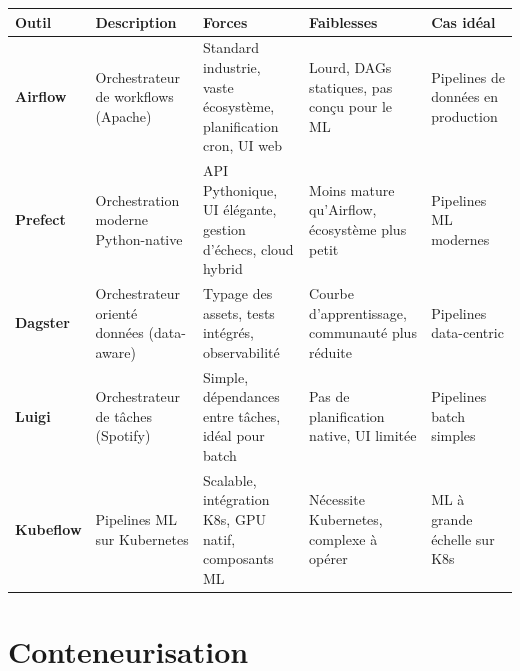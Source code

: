 \begin{center}
\small
\begin{tabular}{@{}p{1.8cm}p{3cm}p{3cm}p{3cm}p{2cm}@{}}
\toprule
\textbf{Outil} & \textbf{Description} & \textbf{Forces} &
  \textbf{Faiblesses} & \textbf{Cas id\'eal} \\
\midrule
\textbf{Airflow} & Orchestrateur de workflows (Apache) &
  Standard industrie, vaste \'ecosyst\`eme, planification cron, UI web &
  Lourd, DAGs statiques, pas con\c{c}u pour le ML &
  Pipelines de donn\'ees en production \\
\addlinespace
\textbf{Prefect} & Orchestration moderne Python-native &
  API Pythonique, UI \'el\'egante, gestion d'\'echecs, cloud hybrid &
  Moins mature qu'Airflow, \'ecosyst\`eme plus petit &
  Pipelines ML modernes \\
\addlinespace
\textbf{Dagster} & Orchestrateur orient\'e donn\'ees (data-aware) &
  Typage des assets, tests int\'egr\'es, observabilit\'e &
  Courbe d'apprentissage, communaut\'e plus r\'eduite &
  Pipelines data-centric \\
\addlinespace
\textbf{Luigi} & Orchestrateur de t\^aches (Spotify) &
  Simple, d\'ependances entre t\^aches, id\'eal pour batch &
  Pas de planification native, UI limit\'ee &
  Pipelines batch simples \\
\addlinespace
\textbf{Kubeflow} & Pipelines ML sur Kubernetes &
  Scalable, int\'egration K8s, GPU natif, composants ML &
  N\'ecessite Kubernetes, complexe \`a op\'erer &
  ML \`a grande \'echelle sur K8s \\
\bottomrule
\end{tabular}
\end{center}

\section{Conteneurisation}
\label{app:containerization}

